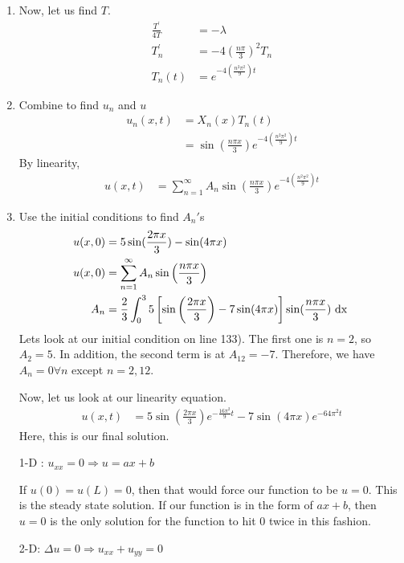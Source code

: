 \begin{enumerate}
  \item Now, let us find $T$.
  \begin{align}
    \frac{T^\prime}{4T} & = -\lambda\\
    T^\prime_n & = -4 \left( \frac{n \pi}{3} \right)^2 T_n\\
    T_n(t) & = e^{-4 \left( \frac{n^2 \pi^2}{9} \right)t}
  \end{align}
  \item Combine to find $u_n$ and $u$
  \begin{align}
    u_n(x, t) & = X_n(x)T_n(t)\\
    & = \sin\left( \frac{n \pi x}{3} \right) e^{-4 \left( \frac{n^2 \pi^2}{9} \right)t}
  \end{align}
  By linearity,
  \begin{align}
    u(x, t) & = \sum^\infty_{n = 1} A_n \sin\left( \frac{n \pi x}{3} \right) e^{-4 \left( \frac{n^2 \pi^2}{9} \right)t}
  \end{align}
  \item Use the initial conditions to find $A_n'$s
  \begin{align}
    u(x, 0) & = 5\sin(\frac{2 \pi x}{3}) - \sin(4 \pi x)\\
    u(x, 0) & = \sum^\infty_{n = 1} A_n \sin\left( \frac{n \pi x}{3} \right)\\
    A_n & = \frac{2}{3} \int^3_0 5 \left[\sin\left( \frac{2 \pi x}{3} \right) - 7 \sin(4 \pi x) \right] \sin(\frac{n \pi x}{3}) \text{ dx }
  \end{align}
  Lets look at our initial condition on line 133). The first one is $n =2$, so $A_2 = 5$. In addition, the second term is at $A_12 = -7$. Therefore, we have $A_n = 0 \forall n$ except $n = 2, 12$.

  Now, let us look at our linearity equation.
  \begin{align}
    u(x, t) & = 5 \sin\left( \frac{2 \pi x}{3} \right) e^{-\frac{16 \pi^2}{9} t} - 7 \sin\left( 4 \pi x \right) e^{-64 \pi^2 t}
  \end{align}
  Here, this is our final solution.

  1-D : $u_{xx} = 0 \Rightarrow u = ax + b$

  If $u(0) = u(L) = 0$, then that would force our function to be $u = 0$. This is the steady state solution. If our function is in the form of $ax + b$, then $u = 0$ is the only solution for the function to hit $0$ twice in this fashion.

  2-D: $\Delta u = 0 \Rightarrow u_{xx} + u_{yy} = 0$


\end{enumerate}
